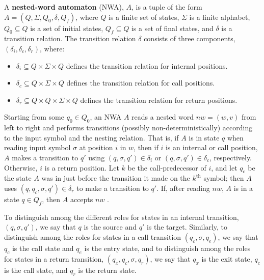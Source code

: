 \documentclass{llncs}
\begin{document}
\begin{definition}
  \label{De:NWA}

  A \textbf{nested-word automaton} (NWA), $A$, is a tuple of the form $A=(Q,
  \Sigma, Q_0, \delta, Q_f)$, where $Q$ is a finite set of states, $\Sigma$
  is a finite alphabet, $Q_0 \subseteq Q$ is a set of initial states, $Q_f
  \subseteq Q$ is a set of final states, and $\delta$ is a transition
  relation. The transition relation $\delta$ consists of three components,
  $(\delta_i, \delta_c, \delta_r)$, where:

  \begin{itemize}
    \item $\delta_i \subseteq Q \times \Sigma \times Q$ defines the
      transition relation for internal positions.
    
    \item $\delta_c \subseteq Q \times \Sigma \times Q$ defines the
      transition relation for call positions.
    
    \item $\delta_r \subseteq Q \times Q \times \Sigma \times Q$ defines the
      transition relation for return positions.
  \end{itemize}
\end{definition}

Starting from some $q_0 \in Q_0$, an NWA $A$ reads a nested word $nw = (w,v)$
from left to right and performs transitions (possibly non-deterministically)
according to the input symbol and the nesting relation. That is, if $A$ is in
state $q$ when reading input symbol $\sigma$ at position $i$ in $w$, then if
$i$ is an internal or call position, $A$ makes a transition to $q'$ using
$(q,\sigma,q') \in \delta_i$ or $(q,\sigma,q') \in \delta_c$,
respectively. Otherwise, $i$ is a return position. Let $k$ be the
call-predecessor of $i$, and let $q_c$ be the state $A$ was in just before
the transition it made on the $k^{\text{th}}$ symbol; then $A$ uses
$(q,q_c,\sigma,q') \in \delta_r$ to make a transition to $q'$.  If, after
reading $nw$, $A$ is in a state $q \in Q_f$, then $A$ accepts $nw$
\cite{DLT:AM2006}.

To distinguish among the different roles for states in an internal
transition, $(q,\sigma,q')$, we say that $q$ is the source and $q'$ is the
target.  Similarly, to distinguish among the roles for states in a call
transition $(q_c,\sigma,q_e)$, we say that $q_c$ is the call state and $q_e$
is the entry state, and to distinguish among the roles for states in a return
transition, $(q_x,q_c,\sigma,q_r)$, we say that $q_x$ is the exit state,
$q_c$ is the call state, and $q_r$ is the return state.
\end{document}
